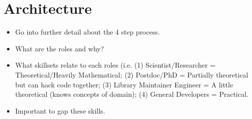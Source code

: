 \section{Architecture}

\begin{itemize}
  \item Go into further detail about the 4 step process.
  \item What are the roles and why?
  \item What skillsets relate to each roles (i.e. (1) Scientist/Researcher = Theoretical/Heavily Mathematical; (2) Postdoc/PhD = Partially theoretical but can hack code together; (3) Library Maintainer Engineer = A little theoretical (knows concepts of domain); (4) General Developers = Practical.
  \item Important to gap these skills.
\end{itemize}